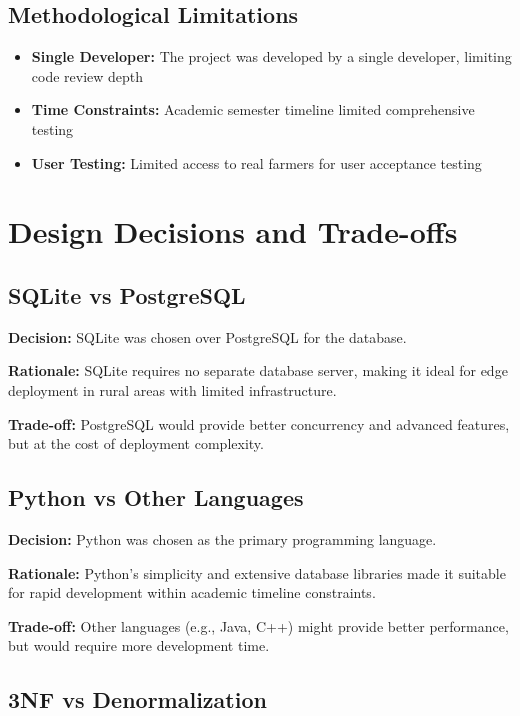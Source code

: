 \subsection{Methodological Limitations}

\begin{itemize}
    \item \textbf{Single Developer:} The project was developed by a single developer, limiting code review depth
    \item \textbf{Time Constraints:} Academic semester timeline limited comprehensive testing
    \item \textbf{User Testing:} Limited access to real farmers for user acceptance testing
\end{itemize}

\section{Design Decisions and Trade-offs}

\subsection{SQLite vs PostgreSQL}

\textbf{Decision:} SQLite was chosen over PostgreSQL for the database.

\textbf{Rationale:} SQLite requires no separate database server, making it ideal for edge deployment in rural areas with limited infrastructure.

\textbf{Trade-off:} PostgreSQL would provide better concurrency and advanced features, but at the cost of deployment complexity.

\subsection{Python vs Other Languages}

\textbf{Decision:} Python was chosen as the primary programming language.

\textbf{Rationale:} Python's simplicity and extensive database libraries made it suitable for rapid development within academic timeline constraints.

\textbf{Trade-off:} Other languages (e.g., Java, C++) might provide better performance, but would require more development time.

\subsection{3NF vs Denormalization}

